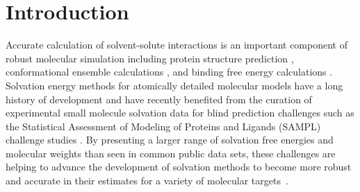 \documentclass[journal=jpcbfk, manuscript=article]{achemso}
\newcommand{\+}[1]{\ensuremath{\mathbf{#1}}}
\begin{document}
\section{Introduction} \label{Introduction}
Accurate calculation of solvent-solute interactions is an important component of robust molecular simulation including protein structure prediction \cite{Levy:03,Robinson:99, Rakhmanov:07}, conformational ensemble calculations \cite{Jorgensen:2004, Cui:2002, Ashbaugh:99,Ashbaugh:2002}, and binding free energy calculations \cite{Yang:2009, Whalen:2013, Mobley:2009}.
Solvation energy methods for atomically detailed molecular models have a long history of development \cite{Eisenberg:1986, Kang:1987:1, Kang:1987:2, Kang:1987:3,Kang:1987:4, Tan:2006, Gallicchio:2002,Baker:2013,Baker:2015} and have recently benefited from the curation of experimental small molecule solvation data for blind prediction challenges such as the Statistical Assessment of Modeling of Proteins and Ligands (SAMPL) challenge studies \cite{Nicholls:2008, Mobley:2009b, Klimovich:2010, Mobley:2009, Geballe:2012, Geballe:2010, Mobley:2014}.
By presenting a larger range of solvation free energies and molecular weights than seen in common public data sets, these challenges are helping to advance the development of solvation methods to become more robust and accurate in their estimates for a variety of molecular targets~\cite{Ellingson:2014,Muddana:2014,Fu:2014}.  
\end{document}
